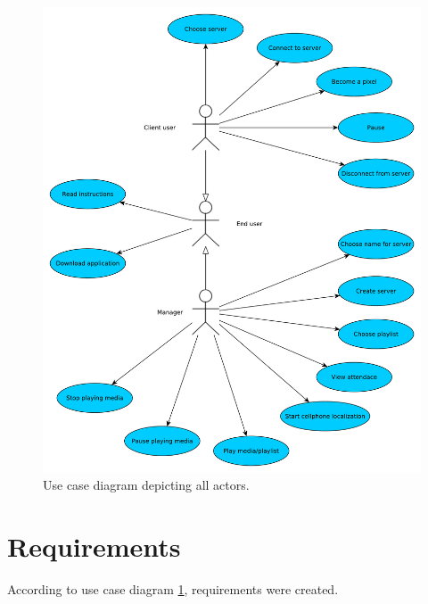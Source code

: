 \begin{figure}[!h]
    \begin{center}
    \includegraphics[scale=0.4]{images/usecase.pdf}
    \caption{Use case diagram depicting all actors.}
    \label{img:usecase}
    \end{center}
\end{figure}

\section{Requirements}
According to use case diagram \ref{img:usecase}, requirements were created.


